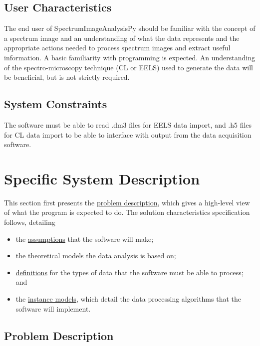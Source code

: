 \documentclass[12pt]{article}
\newcommand{\progname}{SpectrumImageAnalysisPy} %
\begin{document}
\subsection{User Characteristics} \label{SecUserCharacteristics}

The end user of \progname{} should be familiar with the concept of a spectrum
image and an understanding of what the data represents and the appropriate
actions needed to process spectrum images and extract useful information. A
basic familiarity with programming is expected. An
understanding of the spectro-microscopy technique (CL or EELS) used to generate
the data will
be beneficial, but is not strictly required. 

\subsection{System Constraints}

The software must be able to read .dm3 files for EELS data import, and .h5 files
for CL data import to be able to interface with output from the data acquisition
software.  

\section{Specific System Description}

This section first presents the \hyperref[ssec:PD]{problem description}, which gives a high-level
view of what the program is expected to do. The solution characteristics
specification follows, detailing 
\begin{itemize}
    \item the \hyperref[sssec:Assumptions]{assumptions} that the software will make;
    \item the \hyperref[sssec:TM]{theoretical models} the data analysis is based on;
    \item \hyperref[sssec:DD]{definitions} for the types of data that the software must be able to process; and
    \item the \hyperref[sssec:IM]{instance models}, which detail the data processing algorithms that the software will implement.
\end{itemize}

\subsection{Problem Description} \label{ssec:PD}
\end{document}
